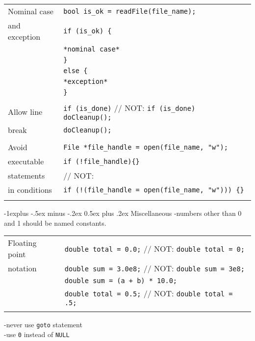 \documentclass[10pt,landscape]{article}
\makeatletter
\renewcommand{\subsection}{\@startsection{subsection}{2}{0mm}%
                                {-1explus -.5ex minus -.2ex}%
                                {0.5ex plus .2ex}%
                                {\normalfont\normalsize\bfseries}}
\makeatother
\begin{document}
\begin{multicols}{3}
\begin{tabular}{@{}ll@{}}
	Nominal case  & \verb!bool is_ok = readFile(file_name);! \\
	and exception & \verb!if (is_ok) {! \\
	              & \hspace{0.2cm} \verb!*nominal case*! \\
	              & \verb!}! \\
	              & \verb!else {! \\
	              & \hspace{0.2cm} \verb!*exception*! \\
	              & \verb!}! \\
	              & \\
	Allow line    & \verb!if (is_done)! // NOT: \verb!if (is_done) doCleanup();! \\
	break         & \hspace{0.2cm} \verb!doCleanup();! \\
	              & \\
	Avoid         & \verb!File *file_handle = open(file_name, "w");! \\
	executable    & \texttt{if (!file\_handle)\{\}} \\
	statements    & // NOT: \\
	in conditions & \texttt{if (!(file\_handle = open(file\_name, "w"))) \{\}} \\
	              & \\
\end{tabular}

\subsection{Miscellaneous}
-numbers other than 0 and 1 should be named constants.\\

\begin{tabular}{@{}ll@{}}
	Floating point& \verb!double total = 0.0;! // NOT: \verb!double total = 0;! \\
	notation      & \verb!double sum = 3.0e8;! // NOT: \verb!double sum = 3e8;! \\
	              & \verb!double sum = (a + b) * 10.0;! \\
	              & \verb!double total = 0.5;! // NOT: \verb!double total = .5;! \\
	              & \\
\end{tabular}
-never use \verb!goto! statement \\
-use \verb!0! instead of \verb!NULL! \\


\end{multicols}
\end{document}
